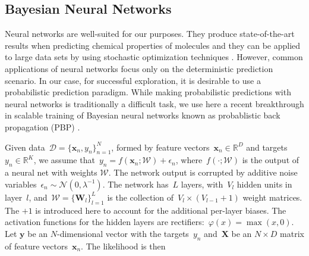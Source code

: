 \subsection{Bayesian Neural Networks}


Neural networks are well-suited for our purposes.
They produce state-of-the-art results when predicting chemical properties of molecules \cite{Ma_2015,Mayr_2016,ramsundar2015massively} and they can be applied to large data sets by using stochastic optimization techniques \cite{bousquet2008tradeoffs}. However, common applications of neural networks focus only on the deterministic prediction scenario. In our case, for successful exploration, it is desirable to use a probabilistic prediction paradigm. While making probabilistic predictions with neural networks is traditionally a difficult task, we use here a recent breakthrough in scalable training of Bayesian neural networks known as probablistic back propagation (PBP) \cite{hernandez2015probabilistic}. 

Given data~${\mathcal{D} = \{\mathbf{x}_n, y_n \}_{n=1}^N}$, formed by feature vectors~${\mathbf{x}_n \in \mathbb{R}^D}$ and targets~${y_n \in \mathbb{R}}^K$, we assume that~${y_n = f(\mathbf{x}_n;\mathcal{W}) + \epsilon_n}$,
where~$f(\cdot ;\mathcal{W})$ is the output of a neural net with weights $\mathcal{W}$. The network output is corrupted by additive noise variables~$\epsilon_n \sim \mathcal{N}(0,\lambda^{-1})$. The network has~$L$ layers, with~$V_l$ hidden units in layer~$l$, and~${\mathcal{W} = \{ \mathbf{W}_l \}_{l=1}^L}$ is the collection of~${V_l \times (V_{l-1}+1)}$ weight matrices. The $+1$ is introduced here to account for the additional per-layer biases.
The activation functions for the hidden layers are rectifiers:~${\varphi(x) = \max(x,0)}$. Let $\mathbf{y}$ be an $N$-dimensional vector with the targets~$y_n$ and~$\mathbf{X}$ be an ${N\times D}$ matrix of feature vectors~$\mathbf{x}_n$. The likelihood is then


